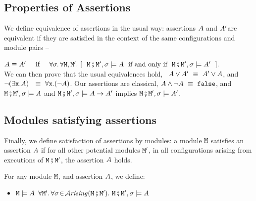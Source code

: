 \subsection{Properties of Assertions}

 
\label{sect:classical} 
We define equivalence of   assertions in the usual way: assertions $\A$ and $\A'$are equivalent if they are satisfied  in
the context of the same configurations and module pairs -- \ie\\
 \strut \hspace{1.1cm} $\A \equiv \A'\  \IFF\    \forall \sigma.\, \forall \M, \M'. \ [\ \ \M\mkpair \M', \sigma \models \A\ \mbox{ if and only if }\ \M\mkpair \M', \sigma \models \A'\ \ ].$\\
We can then prove that the usual equivalences hold, \eg\  $ \A \vee \A' \ \equiv \  \A' \vee \A$, and\   $\neg (\exists \prg{x}.\A )  \  \ \equiv \  \forall \prg{x}.(\neg  \A)$.
%
Our assertions are classical, \eg  $ \A \wedge\neg \A \ \equiv \  \prg{false}$, and $\M\mkpair \M', \sigma  \models \A$ and  $\M\mkpair \M', \sigma  \models \A \rightarrow \A'$  implies
$\M\mkpair \M', \sigma  \models \A '$. 

\subsection{Modules satisfying assertions}

Finally, we define satisfaction of assertions by modules: a module
$\M$ satisfies an assertion $\A$ if for all other potential modules $\M'$, in all configurations arising from executions of $\M\mkpair\M'$, the assertion $\A$ holds.

\begin{definition}
\label{def:module_satisfies}
For any module $\M$, and  assertion $\A$, we define:
\begin{itemize}
\item
$\M \models \A$ \IFF  $\forall \M'.\, \forall \sigma\!\in\!\Arising{\M\mkpair\M'}.\   \M\mkpair\M', \sigma \models \A$
\end{itemize}
\end{definition}

 




